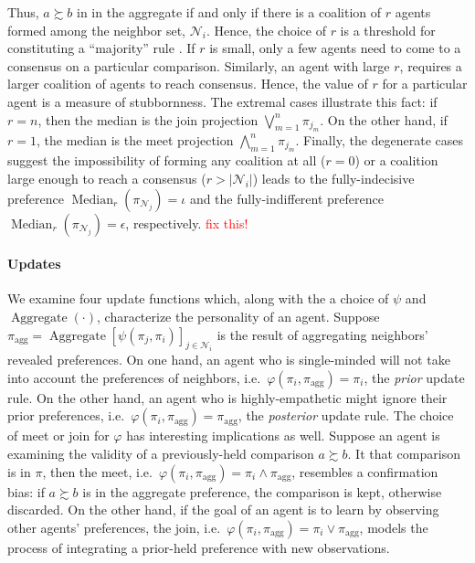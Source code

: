 \documentclass[conference]{ieeeconf}
\newcommand{\N}{\mathcal{N}}
\newcommand{\prefers}{\succsim}
\newcommand{\join}{\vee}
\newcommand{\meet}{\wedge}
\newcommand{\bigjoin}{\bigvee}
\newcommand{\bigmeet}{\bigwedge}
\DeclareMathOperator{\Aggregate}{Aggregate}
\DeclareMathOperator{\Median}{Median}
\begin{document}
Thus, $a \prefers b$ in in the aggregate if and only if there is a coalition of $r$ agents formed among the neighbor set, $\N_i$. Hence, the choice of $r$ is a threshold for constituting a ``majority'' rule \cite{buchanan1965calculus}. If $r$ is small, only a few agents need to come to a consensus on a particular comparison. Similarly, an agent with large $r$, requires a larger coalition of agents to reach consensus. Hence, the value of $r$ for a particular agent is a measure of stubbornness. The extremal cases illustrate this fact: if $r= n$, then the median is the join projection $\bigjoin_{m=1}^n \pi_{j_m}$. On the other hand, if $r=1$, the median is the meet projection $\bigmeet_{m=1}^n \pi_{j_m}$. Finally, the degenerate cases suggest the impossibility of forming any coalition at all ($r=0$) or a coalition large enough to reach a consensus ($r > |\N_i|$) leads to the fully-indecisive preference $\Median_r(\pi_{\N_j}) = \iota$ and the fully-indifferent preference $\Median_r(\pi_{\N_j}) = \epsilon$, respectively. \textcolor{red}{fix this!}


\paragraph*{Updates}
We examine four update functions which, along with the a choice of $\psi$ and $\Aggregate(\cdot)$, characterize the personality of an agent. Suppose $\pi_{\mathrm{agg}} = \Aggregate\left[\psi(\pi_j,\pi_i)\right]_{j \in \N_i}$ is the result of aggregating neighbors' revealed preferences. On one hand, an agent who is single-minded will not take into account the preferences of neighbors, i.e.~$\varphi(\pi_i,\pi_{\mathrm{agg}}) = \pi_i$, the \emph{prior} update rule. On the other hand, an agent who is highly-empathetic might ignore their prior preferences, i.e.~$\varphi(\pi_i,\pi_{\mathrm{agg}}) = \pi_{\mathrm{agg}}$, the \emph{posterior} update rule. The choice of meet or join for $\varphi$ has interesting implications as well. Suppose an agent is examining the validity of a previously-held comparison $a \prefers b$. It that comparison is in $\pi$, then the meet, i.e.~$\varphi(\pi_i,\pi_{\mathrm{agg}}) = \pi_i \meet \pi_{\mathrm{agg}}$, resembles a confirmation bias: if $a \prefers b$ is in the aggregate preference, the comparison is kept, otherwise discarded. On the other hand, if the goal of an agent is to learn by observing other agents' preferences, the join, i.e.~$\varphi(\pi_i,\pi_{\mathrm{agg}}) = \pi_i \join \pi_{\mathrm{agg}}$, models the process of integrating a prior-held preference with new observations.
\end{document}

